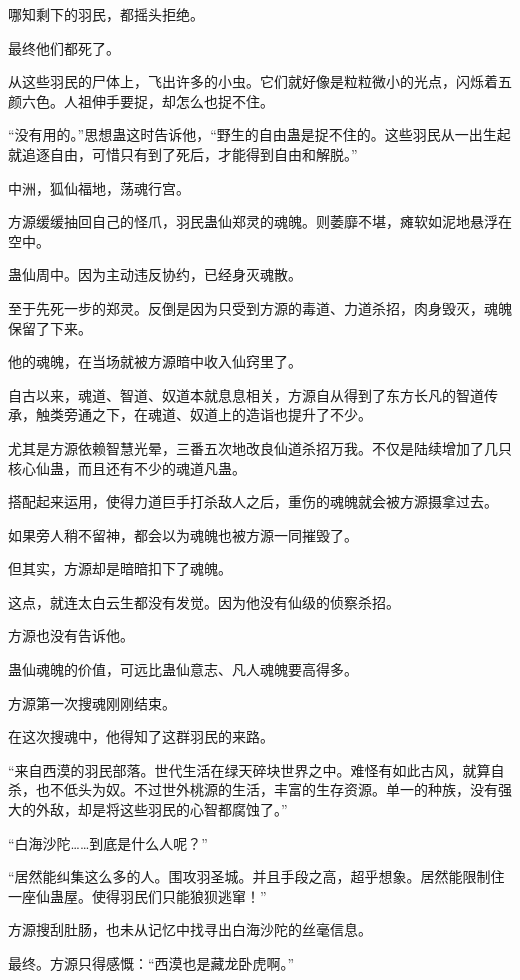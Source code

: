 \begin{this_body}
哪知剩下的羽民，都摇头拒绝。

最终他们都死了。

从这些羽民的尸体上，飞出许多的小虫。它们就好像是粒粒微小的光点，闪烁着五颜六色。人祖伸手要捉，却怎么也捉不住。

“没有用的。”思想蛊这时告诉他，“野生的自由蛊是捉不住的。这些羽民从一出生起就追逐自由，可惜只有到了死后，才能得到自由和解脱。”

中洲，狐仙福地，荡魂行宫。

方源缓缓抽回自己的怪爪，羽民蛊仙郑灵的魂魄。则萎靡不堪，瘫软如泥地悬浮在空中。

蛊仙周中。因为主动违反协约，已经身灭魂散。

至于先死一步的郑灵。反倒是因为只受到方源的毒道、力道杀招，肉身毁灭，魂魄保留了下来。

他的魂魄，在当场就被方源暗中收入仙窍里了。

自古以来，魂道、智道、奴道本就息息相关，方源自从得到了东方长凡的智道传承，触类旁通之下，在魂道、奴道上的造诣也提升了不少。

尤其是方源依赖智慧光晕，三番五次地改良仙道杀招万我。不仅是陆续增加了几只核心仙蛊，而且还有不少的魂道凡蛊。

搭配起来运用，使得力道巨手打杀敌人之后，重伤的魂魄就会被方源摄拿过去。

如果旁人稍不留神，都会以为魂魄也被方源一同摧毁了。

但其实，方源却是暗暗扣下了魂魄。

这点，就连太白云生都没有发觉。因为他没有仙级的侦察杀招。

方源也没有告诉他。

蛊仙魂魄的价值，可远比蛊仙意志、凡人魂魄要高得多。

方源第一次搜魂刚刚结束。

在这次搜魂中，他得知了这群羽民的来路。

“来自西漠的羽民部落。世代生活在绿天碎块世界之中。难怪有如此古风，就算自杀，也不低头为奴。不过世外桃源的生活，丰富的生存资源。单一的种族，没有强大的外敌，却是将这些羽民的心智都腐蚀了。”

“白海沙陀……到底是什么人呢？”

“居然能纠集这么多的人。围攻羽圣城。并且手段之高，超乎想象。居然能限制住一座仙蛊屋。使得羽民们只能狼狈逃窜！”

方源搜刮肚肠，也未从记忆中找寻出白海沙陀的丝毫信息。

最终。方源只得感慨：“西漠也是藏龙卧虎啊。”


\end{this_body}
